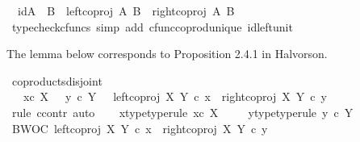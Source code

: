\begin{isabellebody}
\ \ {\isachardoublequoteopen}id{\isacharparenleft}{\kern0pt}A\ {\isasymCoprod}\ B{\isacharparenright}{\kern0pt}\ {\isacharequal}{\kern0pt}\ {\isacharparenleft}{\kern0pt}left{\isacharunderscore}{\kern0pt}coproj\ A\ B{\isacharparenright}{\kern0pt}\ {\isasymamalg}\ {\isacharparenleft}{\kern0pt}right{\isacharunderscore}{\kern0pt}coproj\ A\ B{\isacharparenright}{\kern0pt}{\isachardoublequoteclose}\isanewline
%
\isadelimproof
\ \ \ \ %
\endisadelimproof
%
\isatagproof
{}\isamarkupfalse%
\ {\isacharparenleft}{\kern0pt}typecheck{\isacharunderscore}{\kern0pt}cfuncs{\isacharcomma}{\kern0pt}\ simp\ add{\isacharcolon}{\kern0pt}\ cfunc{\isacharunderscore}{\kern0pt}coprod{\isacharunderscore}{\kern0pt}unique\ id{\isacharunderscore}{\kern0pt}left{\isacharunderscore}{\kern0pt}unit{}{\isacharparenright}{\kern0pt}%
\endisatagproof
{\isafoldproof}%
%
\isadelimproof
%
\endisadelimproof
%
\begin{isamarkuptext}%
The lemma below corresponds to Proposition 2.4.1 in Halvorson.%
\end{isamarkuptext}\isamarkuptrue%
\isamarkupfalse%
\ coproducts{\isacharunderscore}{\kern0pt}disjoint{\isacharcolon}{\kern0pt}\isanewline
\ \ {\isachardoublequoteopen}\ x{\isasymin}\isactrlsub c\ X\ {\isasymLongrightarrow}\ \ y\ {\isasymin}\isactrlsub c\ Y\ {\isasymLongrightarrow}\ \ {\isacharparenleft}{\kern0pt}left{\isacharunderscore}{\kern0pt}coproj\ X\ Y{\isacharparenright}{\kern0pt}\ {\isasymcirc}\isactrlsub c\ x\ {\isasymnoteq}\ {\isacharparenleft}{\kern0pt}right{\isacharunderscore}{\kern0pt}coproj\ X\ Y{\isacharparenright}{\kern0pt}\ {\isasymcirc}\isactrlsub c\ y{\isachardoublequoteclose}\isanewline
%
\isadelimproof
%
\endisadelimproof
%
\isatagproof
{}\isamarkupfalse%
\ {\isacharparenleft}{\kern0pt}rule\ ccontr{\isacharcomma}{\kern0pt}\ auto{\isacharparenright}{\kern0pt}\isanewline
\ \ \isamarkupfalse%
\ x{\isacharunderscore}{\kern0pt}type{\isacharbrackleft}{\kern0pt}type{\isacharunderscore}{\kern0pt}rule{\isacharbrackright}{\kern0pt}{\isacharcolon}{\kern0pt}\ {\isachardoublequoteopen}x{\isasymin}\isactrlsub c\ X{\isachardoublequoteclose}\ \isanewline
\ \ \isamarkupfalse%
\ y{\isacharunderscore}{\kern0pt}type{\isacharbrackleft}{\kern0pt}type{\isacharunderscore}{\kern0pt}rule{\isacharbrackright}{\kern0pt}{\isacharcolon}{\kern0pt}\ {\isachardoublequoteopen}y\ {\isasymin}\isactrlsub c\ Y{\isachardoublequoteclose}\isanewline
\ \ \isamarkupfalse%
\ BWOC{\isacharcolon}{\kern0pt}\ {\isachardoublequoteopen}{\isacharparenleft}{\kern0pt}{\isacharparenleft}{\kern0pt}left{\isacharunderscore}{\kern0pt}coproj\ X\ Y{\isacharparenright}{\kern0pt}\ {\isasymcirc}\isactrlsub c\ x\ {\isacharequal}{\kern0pt}\ {\isacharparenleft}{\kern0pt}right{\isacharunderscore}{\kern0pt}coproj\ X\ Y{\isacharparenright}{\kern0pt}\ {\isasymcirc}\isactrlsub c\ y{\isacharparenright}{\kern0pt}{\isachardoublequoteclose}\isanewline

\end{isabellebody}
